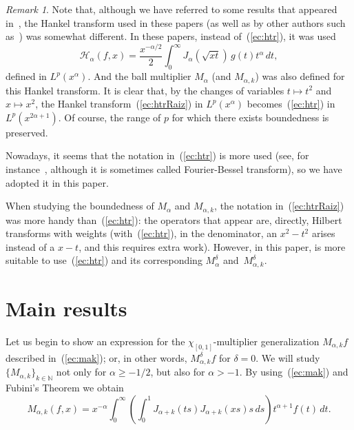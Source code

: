 \documentclass{amsart}
\theoremstyle{remark}
\newtheorem{rem}{Remark}
\newcommand{\N}{\mathbb{N}}
\newcommand{\htr}{\mathcal{H}_{\alpha}}
\newcommand{\ma}{M_{\alpha}}
\newcommand{\mak}{M_{\alpha,k}}
\newcommand{\BR}{M_\alpha^{\delta}}
\newcommand{\BRk}{M_{\alpha,k}^{\delta}}
\begin{document}
\begin{rem}
\label{rem:raiz}
Note that, although we have referred to some results that appeared
in~\cite{Var,GPV-Con,CGPV-FN, CGPV-DIE}, the Hankel transform used in
these papers (as well as by other authors such as~\cite{Dur1,Dur2}) was
somewhat different. In these papers, instead of~(\ref{ec:htr}), it was used
\begin{equation}
\label{ec:htrRaiz}
    \htr(f,x) = \frac{x^{-\alpha/2}}2
      \int_0^\infty J_{\alpha}(\sqrt{xt}) \, g(t) t^\alpha \, dt,
\end{equation}
defined in $L^p(x^\alpha)$. And the ball multiplier $\ma$ (and $\mak$) was also
defined for this Hankel transform. It is clear that, by the changes of
variables $t \mapsto t^2$ and $x \mapsto x^2$, the Hankel
transform~(\ref{ec:htrRaiz}) in $L^p(x^\alpha)$
becomes~(\ref{ec:htr}) in $L^p(x^{2\alpha+1})$. Of course, the
range of $p$ for which there exists boundedness is preserved.

Nowadays, it seems that the notation in~(\ref{ec:htr}) is more used (see,
for instance~\cite{Hir,Iga,GasTr,StemTr,Men,ColCTV,BeRo,BeStem}, although it is
sometimes called Fourier-Bessel transform), so we have adopted it in this
paper.

When studying the boundedness of $\ma$ and $\mak$, the notation
in~(\ref{ec:htrRaiz}) was more handy than~(\ref{ec:htr}): the
operators that appear are, directly, Hilbert transforms with weights
(with~(\ref{ec:htr}), in the denominator, an $x^2-t^2$ arises instead of a
$x-t$, and this requires extra work). However, in this paper, is more
suitable to use~(\ref{ec:htr}) and its corresponding $\BR$ and~$\BRk$.
\end{rem}


\section{Main results}
\label{sec:main}

Let us begin to show an expression for the $\chi_{[0,1]}$-multiplier
generalization $\mak f$ described in~(\ref{ec:mak}); or, in other words,
$\BRk f$ for $\delta=0$. We will study $\{\mak\}_{k\in\N}$ not only for
$\alpha\ge-1/2$, but also for $\alpha>-1$. By using~(\ref{ec:mak}) and
Fubini's Theorem we obtain
\begin{equation}
\label{ec:makConKernel}
   \mak(f,x) = x^{-\alpha} \int_0^\infty
     \left( \int_0^1 J_{\alpha+k} (ts) J_{\alpha+k} (xs) s \, ds \right)
       t^{\alpha+1} f(t) \, dt.
\end{equation}
\end{document}
